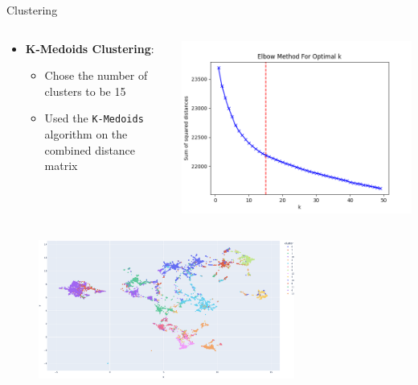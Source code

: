 \documentclass{beamer}
\begin{document}
\begin{frame}{Clustering}
    \begin{columns}
        \begin{column}{0.5\textwidth}
            \begin{itemize}
                \item \textbf{K-Medoids Clustering}:
                \begin{itemize}
                    \item Chose the number of clusters to be 15
                    \item Used the \texttt{K-Medoids} algorithm on the combined distance matrix
                \end{itemize}
            \end{itemize}
        \end{column}
        \begin{column}{0.5\textwidth}
            \centering
            \includegraphics[width=.7\textwidth]{img/elbow_method.png}
        \end{column}
    \end{columns}
    \begin{figure}
        \centering
        \includegraphics[width=0.75\textwidth]{img/combined.png}
    \end{figure}
\end{frame}
\end{document}
